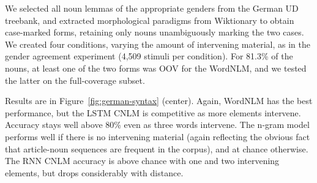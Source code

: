We selected all noun lemmas of the appropriate genders from the German
UD treebank, and extracted morphological paradigms from Wiktionary to
obtain case-marked forms, retaining only nouns unambiguously marking
the two cases.  We created four conditions, varying the amount of
intervening material, as in the gender agreement experiment (4,509
stimuli per condition).  For 81.3\% of the nouns, at least one of the
two forms was OOV for the WordNLM, and we tested the latter on the
full-coverage subset.

Results are in Figure~\ref{fig:german-syntax} (center).  Again,
WordNLM has the best performance, but the LSTM CNLM is competitive as
more elements intervene. Accuracy stays well above 80\% even as three
words intervene.  The n-gram model performs well if there is no
intervening material (again reflecting the obvious fact that
article-noun sequences are frequent in the corpus), and at chance
otherwise.  The RNN CNLM accuracy is above chance with one and two
intervening elements, but drops considerably with distance.

%
%

